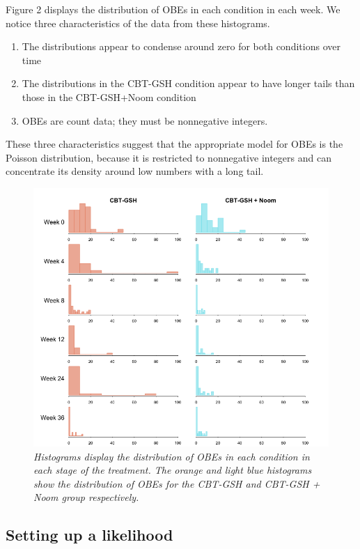 \documentclass{article}
\begin{document}
%
Figure 2 displays the distribution of OBEs in each condition in each week.  We notice three characteristics of the data from these histograms.
\begin{enumerate}
\item{The distributions appear to condense around zero for both conditions over time} 
\item{The distributions in the CBT-GSH condition appear to have longer tails than those in the CBT-GSH+Noom condition}
\item{OBEs are count data; they must be nonnegative integers.}
\end{enumerate}
These three characteristics suggest that the appropriate model for OBEs is the Poisson distribution, because it is restricted to nonnegative integers and can concentrate its density around low numbers with a long tail.
%
\begin{figure}[H]
\begin{center}
\includegraphics[width=\textwidth, height=\textheight, keepaspectratio]{noom_hist.png}
\end{center}
\caption{\emph{Histograms display the distribution of OBEs in each condition in each stage of the treatment. The orange and light blue histograms show the distribution of OBEs for the CBT-GSH and CBT-GSH  + Noom group respectively.}}
\end{figure}
%
\subsection*{Setting up a likelihood}
\end{document}
